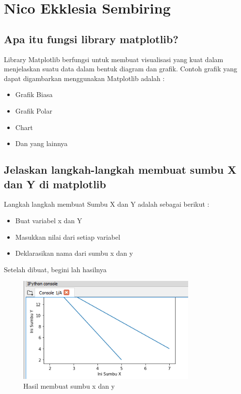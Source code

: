 
\section{Nico Ekklesia Sembiring}
\subsection{Apa itu fungsi library matplotlib?}
Library Matplotlib berfungsi untuk membuat visualisasi yang kuat dalam menjelaskan suatu data dalam bentuk diagram dan grafik. 
Contoh grafik yang dapat digambarkan menggunakan Matplotlib adalah :
\begin{itemize}
    \item Grafik Biasa 
    \item Grafik Polar
    \item Chart
    \item Dan yang lainnya
\end{itemize}

\subsection{Jelaskan langkah-langkah membuat sumbu X dan Y di matplotlib}
Langkah langkah membuat Sumbu X dan Y adalah sebagai berikut :
\begin{itemize}
    \item Buat variabel x dan Y
    \item Masukkan nilai dari setiap variabel
    
    \item Deklarasikan nama dari sumbu x dan y 
    
\end{itemize}

Setelah dibuat, begini lah hasilnya
\begin{figure}[H]
	\includegraphics[width=9cm]{figures/6/Teori/1174096/1.png}
	\caption{Hasil membuat sumbu x dan y}
	\centering
\end{figure}

